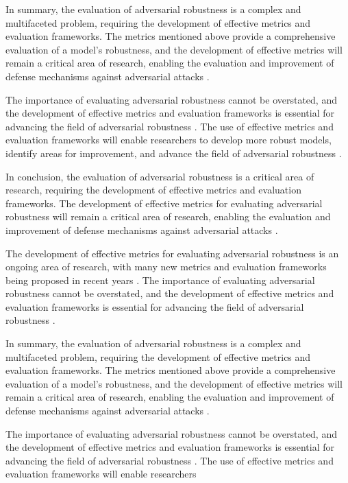 \documentclass[11pt]{article}
\begin{document}
In summary, the evaluation of adversarial robustness is a complex and multifaceted problem, requiring the development of effective metrics and evaluation frameworks. The metrics mentioned above provide a comprehensive evaluation of a model's robustness, and the development of effective metrics will remain a critical area of research, enabling the evaluation and improvement of defense mechanisms against adversarial attacks \cite{ref187}.

The importance of evaluating adversarial robustness cannot be overstated, and the development of effective metrics and evaluation frameworks is essential for advancing the field of adversarial robustness \cite{ref188}. The use of effective metrics and evaluation frameworks will enable researchers to develop more robust models, identify areas for improvement, and advance the field of adversarial robustness \cite{ref189}.

In conclusion, the evaluation of adversarial robustness is a critical area of research, requiring the development of effective metrics and evaluation frameworks. The development of effective metrics for evaluating adversarial robustness will remain a critical area of research, enabling the evaluation and improvement of defense mechanisms against adversarial attacks \cite{ref190}.

The development of effective metrics for evaluating adversarial robustness is an ongoing area of research, with many new metrics and evaluation frameworks being proposed in recent years \cite{ref144}. The importance of evaluating adversarial robustness cannot be overstated, and the development of effective metrics and evaluation frameworks is essential for advancing the field of adversarial robustness \cite{ref177}.

In summary, the evaluation of adversarial robustness is a complex and multifaceted problem, requiring the development of effective metrics and evaluation frameworks. The metrics mentioned above provide a comprehensive evaluation of a model's robustness, and the development of effective metrics will remain a critical area of research, enabling the evaluation and improvement of defense mechanisms against adversarial attacks \cite{ref178}.

The importance of evaluating adversarial robustness cannot be overstated, and the development of effective metrics and evaluation frameworks is essential for advancing the field of adversarial robustness \cite{ref179}. The use of effective metrics and evaluation frameworks will enable researchers
\end{document}
